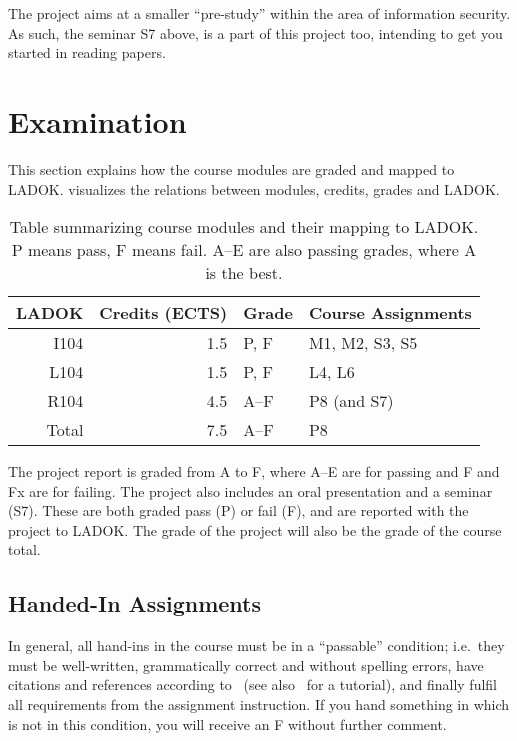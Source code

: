 \documentclass[a4paper]{llncs}
\begin{document}
The project aims at a smaller \enquote{pre-study} within the area of 
information security.
As such, the seminar S7 above, is a part of this project too, intending to get 
you started in reading papers.


\section{Examination}
\label{Examination}

This section explains how the course modules are graded and mapped to LADOK\@.
 visualizes the relations between modules, credits, grades and 
LADOK\@.

\begin{table}
  \centering
  \caption{%
    Table summarizing course modules and their mapping to LADOK\@.
    P means pass, F means fail.
    A--E are also passing grades, where A is the best.
  }\label{LADOKTable}
  \begin{tabular}{rrll}
    \toprule
    LADOK & Credits (ECTS)  & Grade       & Course Assignments\\
    \midrule
    I104  & 1.5             & P, F        & M1, M2, S3, S5\\
    L104  & 1.5             & P, F        & L4, L6\\
    R104  & 4.5             & A--F        & P8 (and S7)\\
    \midrule
    Total & 7.5             & A--F        & P8\\
    \bottomrule
  \end{tabular}
\end{table}

The project report is graded from A to F, where A--E are for passing and F and 
Fx are for failing.
The project also includes an oral presentation and a seminar (S7).
These are both graded pass (P) or fail (F), and are reported with the project 
to LADOK\@.
The grade of the project will also be the grade of the course total.

\subsection{Handed-In Assignments}

In general, all hand-ins in the course must be in a \enquote{passable} 
condition; i.e.~they must be well-written, grammatically correct and without 
spelling errors, have citations and references according to~\cite{IEEEcitation} 
(see also~\cite{PurdueCitation} for a tutorial), and finally fulfil all 
requirements from the assignment instruction.
If you hand something in which is not in this condition, you will receive an 
F without further comment.
\end{document}
